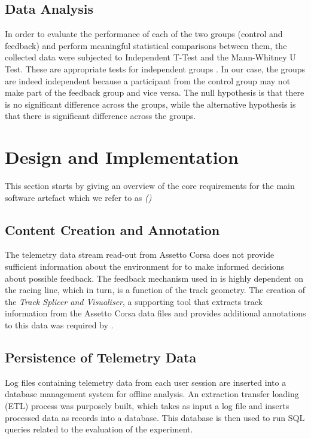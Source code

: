 \documentclass{sig-alternate}
\begin{document}
\subsection{Data Analysis}
In order to evaluate the performance of each of the two groups (control and feedback) and perform meaningful statistical comparisons between them, the collected data were subjected to Independent T-Test\cite{student1908probable} and the Mann-Whitney U Test\cite{mann1947test}. These are appropriate tests for independent groups \cite{de2015statsref}. In our case, the groups are indeed independent because a participant from the control group may not make part of the feedback group and vice versa. The null hypothesis is that there is no significant difference across the groups, while the alternative hypothesis is that there is significant difference across the groups.

\section{Design and Implementation}
\label{sec:DesignImplementation}

This section starts by giving an overview of the core requirements for the main software artefact which we refer to as \emph{\methodnamefull (\methodname)}

\subsection{Content Creation and Annotation}
The telemetry data stream read-out from Assetto Corsa does not provide sufficient information about the environment for \methodname to make informed decisions about possible feedback. The feedback mechanism used in \methodname is highly dependent on the racing line, which in turn, is a function of the track geometry. The creation of the \emph{Track Splicer and Visualiser}, a supporting tool that extracts track information from the Assetto Corsa data files and provides additional annotations to this data was required by \methodname.

\subsection{Persistence of Telemetry Data}
Log files containing telemetry data from each user session are inserted into a database management system for offline analysis. An extraction transfer loading (ETL\cite{kimball2004data}) process was purposely built, which takes as input a log file and inserts processed data as records into a database. This database is then used to run SQL queries related to the evaluation of the experiment.
\end{document}
